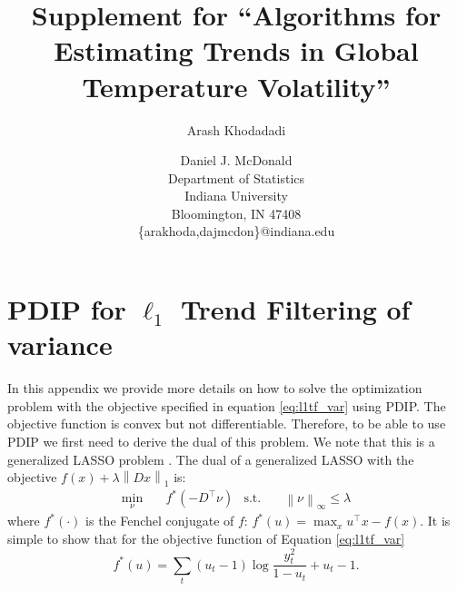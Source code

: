 \documentclass[letterpaper]{article} %
\newcommand{\citep}{\cite}
\newcommand{\norm}[1]{\left\lVert #1 \right\rVert}
\begin{document}
 

\title{Supplement for ``Algorithms for Estimating Trends in Global Temperature Volatility''}

\author{Arash Khodadadi \and Daniel J. McDonald\\
 Department of Statistics\\
 Indiana University\\
 Bloomington, IN 47408 \\
 \{arakhoda,dajmcdon\}@indiana.edu}






\maketitle


\appendix
\section{PDIP for $\ell_1$ Trend Filtering of variance}
\label{sec:app_l1tf_var}

In this appendix we provide more details on how to solve the optimization problem with the objective specified in equation \ref{eq:l1tf_var} using PDIP. The objective function is convex but not differentiable. Therefore, to be able to use PDIP we first need to derive the dual of this problem. We note that this is a generalized LASSO problem \citep{TibshiraniTaylor2011}. The dual of a generalized LASSO with the objective $f(x)+\lambda \norm{ Dx }_1$ is:  
\begin{align}
\min_\nu&\quad f^*(-D^\top\nu) & \mbox{s.t.}&\quad \norm{ \nu }_\infty \le \lambda
\end{align}
where $f^*(\cdot)$ is the Fenchel conjugate of $f$: $f^*(u)=\max_x u^\top x-f(x)$. It is simple to show that for the objective function of Equation \ref{eq:l1tf_var}
\begin{equation}
f^*(u)=\sum_t (u_t-1)\log\frac{y_t^2}{1-u_t} + u_t-1.
\label{eq:conj}
\end{equation}
\end{document}
